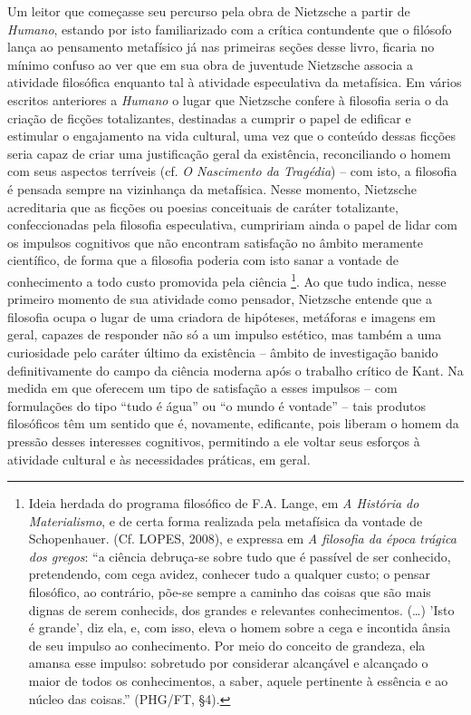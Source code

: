 \documentclass[
	12pt,				%
	openright,			%
	oneside,			%
	a4paper,			%
	english,			%
	french,				%
	spanish,			%
	brazil				%
	]{abntex2}
\newcommand{\Hum}{\textit{Humano}\xspace}
\begin{document}
	Um leitor que começasse seu percurso pela obra de Nietzsche a partir de \Hum, estando por isto familiarizado com a crítica contundente que o filósofo lança ao pensamento metafísico já nas primeiras seções desse livro, ficaria no mínimo confuso ao ver que em sua obra de juventude Nietzsche associa a atividade filosófica enquanto tal à atividade especulativa da metafísica. Em vários escritos anteriores a \Hum o lugar que Nietzsche confere à filosofia seria o da criação de ficções totalizantes, destinadas a cumprir o papel de edificar e estimular o engajamento na vida cultural, uma vez que o conteúdo dessas ficções seria capaz de criar uma justificação geral da existência, reconciliando o homem com seus aspectos terríveis (cf. \textit{O Nascimento da Tragédia}) – com isto, a filosofia é pensada sempre na vizinhança da metafísica. Nesse momento, Nietzsche acreditaria que as ficções ou poesias conceituais de caráter totalizante, confeccionadas pela filosofia especulativa, cumpririam ainda o papel de lidar com os impulsos cognitivos que não encontram satisfação no âmbito meramente científico, de forma que a filosofia poderia com isto sanar a vontade de conhecimento a todo custo promovida pela ciência
	\footnote{Ideia herdada do programa filosófico de F.A. Lange, em \textit{A História do Materialismo}, e de certa forma realizada pela  metafísica da vontade de Schopenhauer. (Cf. LOPES, 2008), e expressa em \textit{A filosofia da época trágica dos gregos}: “a ciência debruça-se sobre tudo que é passível de ser conhecido, pretendendo, com cega avidez, conhecer tudo a qualquer custo; o pensar filosófico, ao contrário, põe-se sempre a caminho das coisas que são mais dignas de serem conhecids, dos grandes e relevantes conhecimentos. (…) 'Isto é grande', diz ela, e, com isso, eleva o homem sobre a cega e incontida ânsia de seu impulso ao conhecimento. Por meio do conceito de grandeza, ela amansa esse impulso: sobretudo por considerar alcançável e alcançado o maior de todos os conhecimentos, a saber, aquele pertinente à essência e ao núcleo das coisas.” (PHG/FT, §4).}.
	 Ao que tudo indica, nesse primeiro momento de sua atividade como pensador, Nietzsche entende que a filosofia ocupa o lugar de uma criadora de hipóteses, metáforas e imagens em geral, capazes de responder não só a um impulso estético, mas também a uma curiosidade pelo caráter último da existência – âmbito de investigação banido definitivamente do campo da ciência moderna após o trabalho crítico de Kant. Na medida em que oferecem um tipo de satisfação a esses impulsos – com formulações do tipo “tudo é água” ou “o mundo é vontade” – tais produtos filosóficos têm um sentido que é, novamente, edificante, pois liberam o homem da pressão desses interesses cognitivos, permitindo a ele voltar seus esforços à atividade cultural e às necessidades práticas, em geral.
\end{document}
